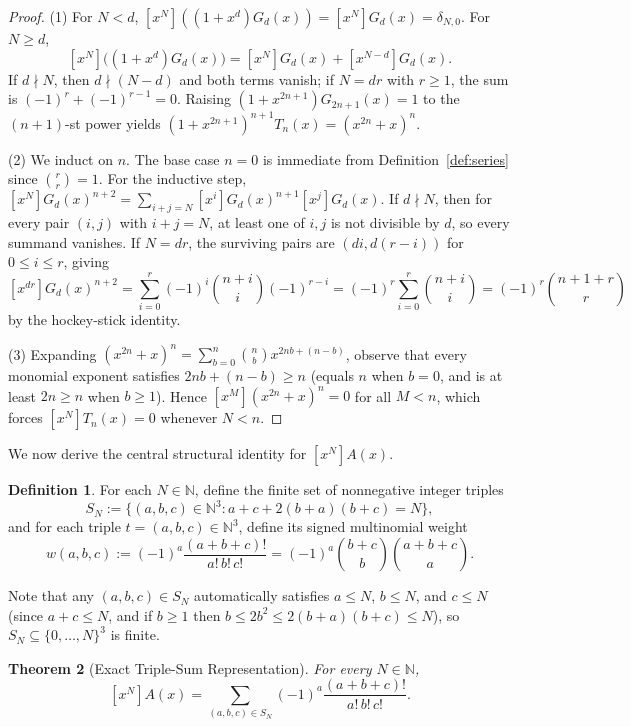 \documentclass[11pt,a4paper]{article}
\newtheorem{theorem}{Theorem}[section]
\theoremstyle{definition}
\newtheorem{definition}[theorem]{Definition}
\theoremstyle{remark}
\newcommand{\N}{\mathbb{N}}
\newcommand{\coeff}[1]{[x^{#1}]}
\begin{document}
\begin{proof}
(1) For $N < d$, $\coeff{N}((1+x^d) G_d(x)) = \coeff{N} G_d(x) = \delta_{N,0}$. For $N \ge d$,
\[
\coeff{N}\bigl((1+x^d) G_d(x)\bigr) = \coeff{N} G_d(x) + \coeff{N-d} G_d(x).
\]
If $d \nmid N$, then $d \nmid (N-d)$ and both terms vanish; if $N = dr$ with $r \ge 1$, the sum is $(-1)^r + (-1)^{r-1} = 0$. Raising $(1+x^{2n+1}) G_{2n+1}(x) = 1$ to the $(n+1)$-st power yields $(1+x^{2n+1})^{n+1} T_n(x) = (x^{2n}+x)^n$.

(2) We induct on $n$. The base case $n = 0$ is immediate from Definition~\ref{def:series} since $\binom{r}{r} = 1$. For the inductive step, $\coeff{N} G_d(x)^{n+2} = \sum_{i+j=N} \coeff{i} G_d(x)^{n+1} \coeff{j} G_d(x)$. If $d \nmid N$, then for every pair $(i,j)$ with $i+j=N$, at least one of $i, j$ is not divisible by $d$, so every summand vanishes. If $N = dr$, the surviving pairs are $(di, d(r-i))$ for $0 \le i \le r$, giving
\[
\coeff{dr} G_d(x)^{n+2}
= \sum_{i=0}^{r} (-1)^i \binom{n+i}{i} (-1)^{r-i}
= (-1)^r \sum_{i=0}^{r} \binom{n+i}{i}
= (-1)^r \binom{n+1+r}{r}
\]
by the hockey-stick identity.

(3) Expanding $(x^{2n} + x)^n = \sum_{b=0}^{n} \binom{n}{b} x^{2nb + (n-b)}$, observe that every monomial exponent satisfies $2nb + (n-b) \ge n$ (equals $n$ when $b=0$, and is at least $2n \ge n$ when $b \ge 1$). Hence $\coeff{M}(x^{2n}+x)^n = 0$ for all $M < n$, which forces $\coeff{N} T_n(x) = 0$ whenever $N < n$.
\end{proof}

We now derive the central structural identity for $\coeff{N} A(x)$.

\begin{definition}\label{def:triple}
For each $N \in \N$, define the finite set of nonnegative integer triples
\[
S_N := \bigl\{(a, b, c) \in \N^3 : a + c + 2(b+a)(b+c) = N\bigr\},
\]
and for each triple $t = (a,b,c) \in \N^3$, define its signed multinomial weight
\[
w(a,b,c) := (-1)^a \frac{(a+b+c)!}{a!\,b!\,c!} = (-1)^a \binom{b+c}{b}\binom{a+b+c}{a}.
\]
\end{definition}

Note that any $(a,b,c) \in S_N$ automatically satisfies $a \le N$, $b \le N$, and $c \le N$ (since $a+c \le N$, and if $b \ge 1$ then $b \le 2b^2 \le 2(b+a)(b+c) \le N$), so $S_N \subseteq \{0,\dots,N\}^3$ is finite.

\begin{theorem}[Exact Triple-Sum Representation]\label{thm:triple}
For every $N \in \N$,
\begin{equation}\label{eq:triple}
\coeff{N} A(x) = \sum_{(a,b,c) \in S_N} (-1)^a \frac{(a+b+c)!}{a!\,b!\,c!}.
\end{equation}
\end{theorem}
\end{document}
